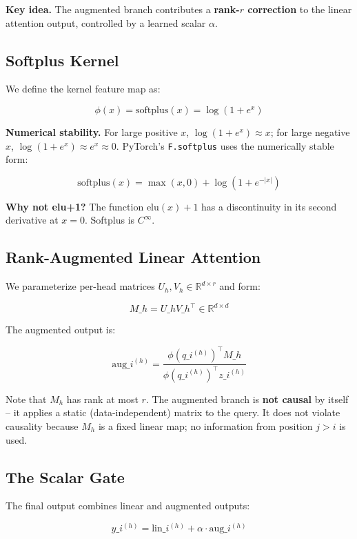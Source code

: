 \textbf{Key idea.} The augmented branch contributes a \textbf{rank-$r$ correction} 
to the linear attention output, controlled by a learned scalar $\alpha$.

\subsection{Softplus Kernel}

We define the kernel feature map as:

\[
\phi(x) = \mathrm{softplus}(x) = \log(1 + e^x)
\tag{4.1}
\]

\textbf{Numerical stability.} For large positive $x$, $\log(1 + e^x) \approx x$; 
for large negative $x$, $\log(1 + e^x) \approx e^x \approx 0$. PyTorch's 
\texttt{F.softplus} uses the numerically stable form:

\[
\mathrm{softplus}(x) = \max(x, 0) + \log(1 + e^{-|x|})
\tag{4.2}
\]

\textbf{Why not elu+1?} The function $\mathrm{elu}(x) + 1$ has a discontinuity 
in its second derivative at $x = 0$. Softplus is $C^\infty$.

\subsection{Rank-Augmented Linear Attention}

We parameterize per-head matrices $U_h, V_h \in \mathbb{R}^{d \times r}$ and 
form:

\[
M\_h = U\_h V\_h^\top \in \mathbb{R}^{d \times d}
\tag{4.3}
\]

The augmented output is:

\[
\text{aug}\_i^{(h)} = \frac{\phi(q\_i^{(h)})^\top M\_h}{\phi(q\_i^{(h)})^\top z\_i^{(h)}}
\tag{4.4}
\]

Note that $M_h$ has rank at most $r$. The augmented branch is \textbf{not causal} 
by itself -- it applies a static (data-independent) matrix to the query. It 
does not violate causality because $M_h$ is a fixed linear map; no 
information from position $j > i$ is used.

\subsection{The Scalar Gate}

The final output combines linear and augmented outputs:

\[
y\_i^{(h)} = \text{lin}\_i^{(h)} + \alpha \cdot \text{aug}\_i^{(h)}
\tag{4.5}
\]

